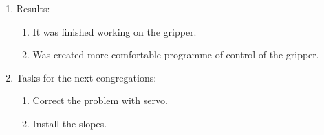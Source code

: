\begin{enumerate}
\begin{enumerate}
    \end{enumerate}
    
	\item Results: 
	\begin{enumerate}
	  \item It was finished working on the gripper.
	  
      \item Was created more comfortable programme of control of the gripper.
      
    \end{enumerate}
    
	\item Tasks for the next congregations:
	\begin{enumerate}
	  \item Correct the problem with servo.
	  
	  \item Install the slopes.

    \end{enumerate}     
\end{enumerate}
\fillpage
